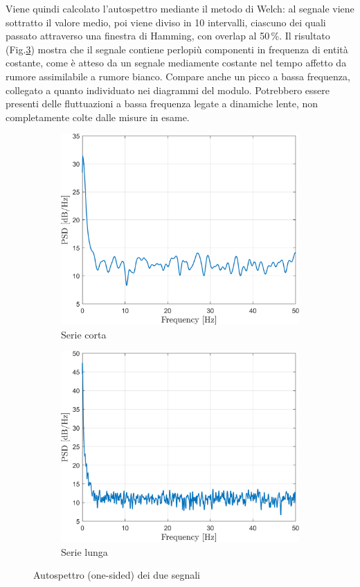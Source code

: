 Viene quindi calcolato l'autospettro mediante il metodo di Welch: al segnale viene sottratto il valore medio, poi viene diviso in 10 intervalli, ciascuno dei quali passato attraverso una finestra di Hamming, con overlap al 50\,\%. Il risultato (Fig.\ref{fig:freqboth}) mostra che il segnale contiene perlopiù componenti in frequenza di entità costante, come è atteso da un segnale mediamente costante nel tempo affetto da rumore assimilabile a rumore bianco. Compare anche un picco a bassa frequenza, collegato a quanto individuato nei diagrammi del modulo.
Potrebbero essere presenti delle fluttuazioni a bassa frequenza legate a dinamiche lente, non completamente colte dalle misure in esame. 
\begin{figure}[H]
	\centering
	\begin{subfigure}{0.5\textwidth}
		\centering
	\includegraphics[width=0.95\linewidth]{"../sperimentazione nei propulsori/freq_short"}
	\caption{Serie corta}
	\label{fig:freqshort}
	\end{subfigure}%
	\begin{subfigure}{0.5\textwidth}
	\centering
\includegraphics[width=0.95\linewidth]{"../sperimentazione nei propulsori/freq_long"}
\caption{Serie lunga}
\label{fig:freqlong}
	\end{subfigure}
	\caption{Autospettro (one-sided) dei due segnali}
	\label{fig:freqboth}
\end{figure}
